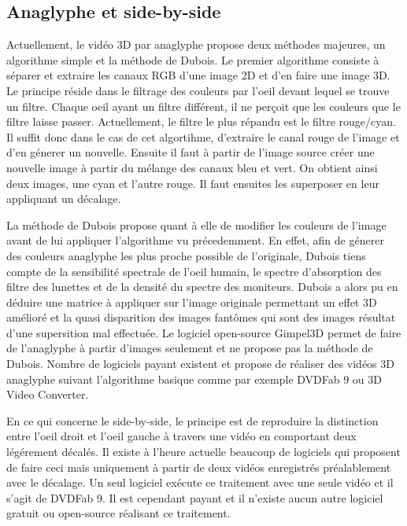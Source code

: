 \documentclass[10pt,a4paper]{article}
\begin{document}
\subsection{Anaglyphe et side-by-side}
\label{anasbs}
Actuellement, le vidéo 3D par anaglyphe propose deux méthodes majeures, un algorithme simple et la méthode de Dubois.
Le premier algorithme consiste à séparer et extraire les canaux RGB d'une image 2D et d'en faire une image 3D. Le principe réside dans le filtrage des couleurs par l'oeil devant lequel se trouve un filtre.
Chaque oeil ayant un filtre différent, il ne perçoit que les couleurs que le filtre laisse passer. Actuellement, le filtre le plus répandu est le filtre rouge/cyan.
Il suffit donc dans le cas de cet algortihme, d'extraire le canal rouge de l'image et d'en génerer un nouvelle. Ensuite il faut à partir de l'image source créer une nouvelle image à partir du mélange des canaux bleu et vert.
On obtient ainsi deux images, une cyan et l'autre rouge. Il faut ensuites les superposer en leur appliquant un décalage.\newline

La méthode de Dubois propose quant à elle de modifier les couleurs de l'image avant de lui appliquer l'algorithme vu précedemment.
En effet, afin de génerer des couleurs anaglyphe les plus proche possible de l'originale, Dubois tiens compte de la sensibilité spectrale de l'oeil humain,
le spectre d'absorption des filtre des lunettes et de la densité du spectre des moniteurs.
Dubois a alors pu en déduire une matrice à appliquer sur l'image originale permettant un effet 3D amélioré et la quasi
disparition des images fantômes qui sont des images résultat d'une supersition mal effectuée.
Le logiciel open-source Gimpel3D permet de faire de l'anaglyphe à partir d'images seulement et ne propose pas la méthode de Dubois. Nombre de logiciels payant existent et propose de réaliser des vidéos 3D
anaglyphe suivant l'algorithme basique comme par exemple DVDFab 9 ou  3D Video Converter.\newline

En ce qui concerne le side-by-side, le principe est de reproduire la distinction entre l'oeil droit et l'oeil gauche à travers une vidéo en comportant deux légérement décalés.
Il existe à l'heure actuelle beaucoup de logiciels qui proposent de faire ceci mais uniquement à partir de deux vidéos enregistrés préalablement avec le décalage.
Un seul logiciel exécute ce traitement avec une seule vidéo et il s'agit de DVDFab 9. Il est cependant payant et il n'existe aucun autre logiciel gratuit ou open-source réalisant ce traitement.
\end{document}
